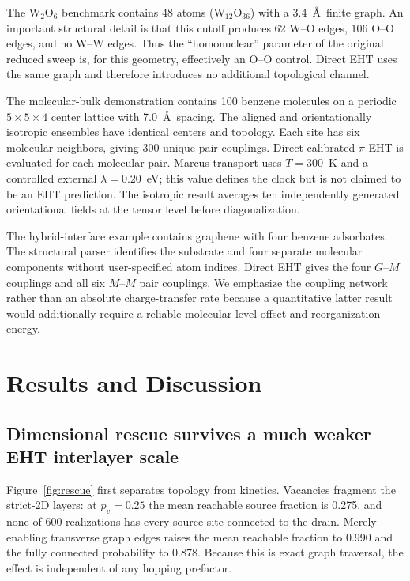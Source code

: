 \documentclass[aps,prmaterials,reprint,amsmath,amssymb,superscriptaddress,longbibliography]{revtex4-2}
\begin{document}
The W$_2$O$_6$ benchmark contains 48 atoms (W$_{12}$O$_{36}$) with a 3.4~\AA\ finite graph. An important structural detail is that this cutoff produces 62 W--O edges, 106 O--O edges, and no W--W edges. Thus the ``homonuclear'' parameter of the original reduced sweep is, for this geometry, effectively an O--O control. Direct EHT uses the same graph and therefore introduces no additional topological channel.

The molecular-bulk demonstration contains 100 benzene molecules on a periodic $5\times5\times4$ center lattice with 7.0~\AA\ spacing. The aligned and orientationally isotropic ensembles have identical centers and topology. Each site has six molecular neighbors, giving 300 unique pair couplings. Direct calibrated $\pi$-EHT is evaluated for each molecular pair. Marcus transport uses $T=300$~K and a controlled external $\lambda=0.20$~eV; this value defines the clock but is not claimed to be an EHT prediction. The isotropic result averages ten independently generated orientational fields at the tensor level before diagonalization.

The hybrid-interface example contains graphene with four benzene adsorbates. The structural parser identifies the substrate and four separate molecular components without user-specified atom indices. Direct EHT gives the four $G$--$M$ couplings and all six $M$--$M$ pair couplings. We emphasize the coupling network rather than an absolute charge-transfer rate because a quantitative latter result would additionally require a reliable molecular level offset and reorganization energy.


\section{Results and Discussion}
\subsection{Dimensional rescue survives a much weaker EHT interlayer scale}
Figure~\ref{fig:rescue} first separates topology from kinetics. Vacancies fragment the strict-2D layers: at $p_v=0.25$ the mean reachable source fraction is 0.275, and none of 600 realizations has every source site connected to the drain. Merely enabling transverse graph edges raises the mean reachable fraction to 0.990 and the fully connected probability to 0.878. Because this is exact graph traversal, the effect is independent of any hopping prefactor.
\end{document}

